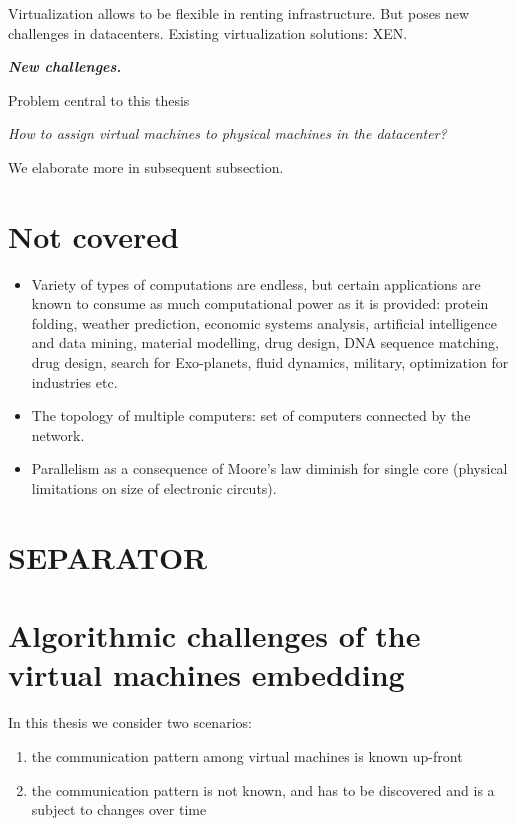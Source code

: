 Virtualization allows to be flexible in renting infrastructure. But poses new challenges in datacenters.
Existing virtualization solutions: XEN.

\textbf{\emph{New challenges.}}

Problem central to this thesis

\begin{center}
  \emph{How to assign virtual machines to physical machines in the datacenter?}
\end{center}

We elaborate more in subsequent subsection.

\section{Not covered}


\begin{itemize}
  \item
Variety of types of computations are endless, but certain applications are known to consume as much computational power as it is provided: protein folding, weather prediction, economic systems analysis, artificial intelligence and data mining, material modelling, drug design, DNA sequence matching, drug design, search for Exo-planets, fluid dynamics, military, optimization for industries etc.
\item The topology of multiple computers: set of computers connected by the network.
\item Parallelism as a consequence of Moore's law diminish for single core (physical limitations on size of electronic circuts).
\end{itemize}


\section{SEPARATOR}

\section{Algorithmic challenges of the virtual machines embedding}

In this thesis we consider two scenarios:
\begin{enumerate}
  \item the communication pattern among virtual machines is known up-front
  \item the communication pattern is not known, and has to be discovered and is a subject to changes over time
\end{enumerate}

